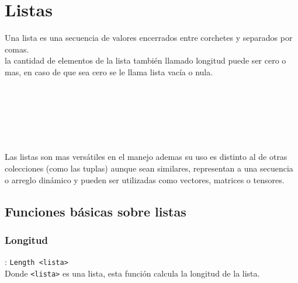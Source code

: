 
\titlespacing{\subsection}{0pt}{10pt}{0pt}

\chapter{Listas}
   Una lista es una secuencia de valores encerrados entre corchetes y separados por comas.
   \\
   
   la cantidad de elementos de la lista también llamado longitud puede ser cero o mas, en caso de que sea cero se le llama lista vacía o nula.
   
   \begin{fxcode}
      \\
      \\
      \arrowcode{[]}\\
      \outcode{[]}\\
      \arrowcode{[EncodeChar 32, 1, 23*12, 4 = 3]}\\
   \end{fxcode}
   
   Las listas son mas versátiles en el manejo ademas su uso es distinto al de otras colecciones (como las tuplas) aunque sean similares, representan a una secuencia o arreglo dinámico y pueden ser utilizadas como vectores, matrices o tensores.
   
   \section{Funciones básicas sobre listas}
      
      \subsection*{Longitud}: \texttt{Length <lista>}\\
      Donde \texttt{<lista>} es una lista, esta función calcula la longitud de la lista.
      
